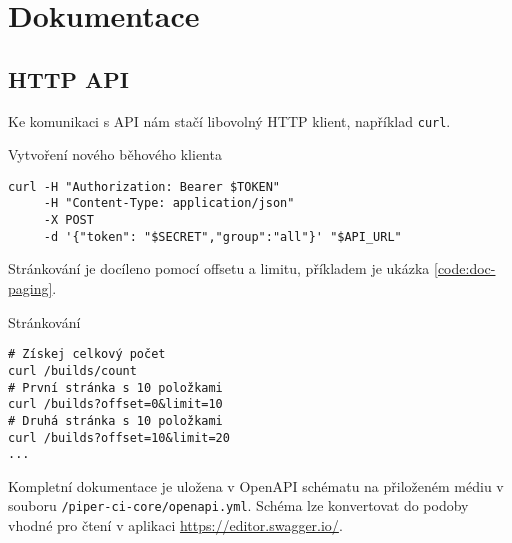 \chapter{Dokumentace}

\section{HTTP API}

Ke komunikaci s API nám stačí libovolný HTTP klient, například \verb|curl|.

\begin{listing}[ht]
\caption{Vytvoření nového běhového klienta}
\begin{verbatim}
curl -H "Authorization: Bearer $TOKEN" 
     -H "Content-Type: application/json" 
     -X POST
     -d '{"token": "$SECRET","group":"all"}' "$API_URL"
\end{verbatim}
\end{listing}

Stránkování je docíleno pomocí offsetu a limitu, příkladem je ukázka \ref{code:doc-paging}.

\begin{listing}[ht]
\caption{\label{code:doc-paging}Stránkování}
\begin{verbatim}
# Získej celkový počet
curl /builds/count
# První stránka s 10 položkami
curl /builds?offset=0&limit=10
# Druhá stránka s 10 položkami
curl /builds?offset=10&limit=20
...
\end{verbatim}
\end{listing}

Kompletní dokumentace je uložena v OpenAPI schématu na přiloženém médiu v souboru \verb|/piper-ci-core/openapi.yml|.
Schéma lze konvertovat do podoby vhodné pro čtení v aplikaci \url{https://editor.swagger.io/}.

